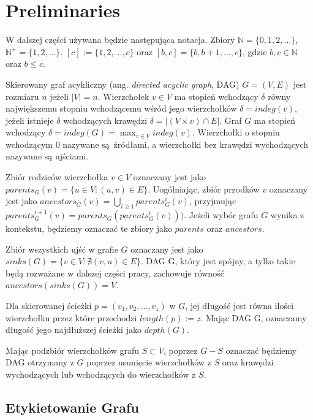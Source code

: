 \chapter{Preliminaries}
\thispagestyle{chapterBeginStyle}
\label{rozdzial1}

W dalszej części używana będzie następująca notacja.
Zbiory $\mathbb{N} = \{ 0,1,2,\dots \}$, $ \mathbb{N}^{+} = \{ 1, 2, \dots \}$.
$[c] := \{1, 2,\dots,c \}$ oraz $[b, c] = \{ b, b+1, \dots, c \}$, gdzie $b, c \in \mathbb{N}$ oraz $b \leq c$.

Skierowany graf acykliczny (ang. \textit{directed acyclic graph}, DAG) $G = (V, E)$ jest rozmiaru $n$ jeżeli $|V| = n$.
Wierzchołek $v \in V$ ma stopień wchodzący $\delta$ równy największemu stopniu wchodzącemu wśród jego wierzchołków $\delta = indeg(v)$, jeżeli istnieje $\delta$ wchodzących krawędzi $\delta = | \left( V \times {v} \right) \cap E|$.
Graf $G$ ma stopień wchodzący $ \delta = indeg(G) = \max_{v \in V} indeg(v)$.
Wierzchołki o stopniu wchodzącym 0 nazywane są źródłami, a wierzchołki bez krawędzi wychodzących nazywane są ujściami.

Zbiór rodziców wierzchołka $v \in V$ oznaczany jest jako $parents_{G}(v) = \{ u \in V: (u, v) \in E \}$.
Uogólniając, zbiór przodków $v$ oznaczany jest jako $ancestors_{G}(v) = \bigcup_{i \geq 1}parents_{G}^{i}(v)$, przyjmując $parents_{G}^{i+1}(v) = parents_{G}(parents_{G}^{i}(v)))$. Jeżeli wybór grafu $G$ wynika z kontekstu, będziemy oznaczać te zbiory jako $parents$ oraz $ancestors$.

Zbiór wszystkich ujść w grafie $G$ oznaczany jest jako $sinks(G) = \{ v \in V : \nexists (v, u) \in E \}$. DAG G, który jest spójny, a tylko takie będą rozważane w dalszej części pracy, zachowuje równość $ancestors(sinks(G)) = V$.

Dla skierowanej ścieżki $p = (v_{1},v_{2},\dots,v_{z})$ w $G$, jej długość jest równa ilości wierzchołku przez które przechodzi $length(p) := z$.
Mając DAG G, oznaczamy długość jego najdłuższej ścieżki jako $depth(G)$.

Mając podzbiór wierzchołków grafu $S \subset V$, poprzez $G - S$ oznaczać będziemy DAG otrzymany z $G$ poprzez usunięcie wierzchołków z $S$ oraz krawędzi wychodzących lub wchodzących do wierzchołków z $S$.

\section{Etykietowanie Grafu}

